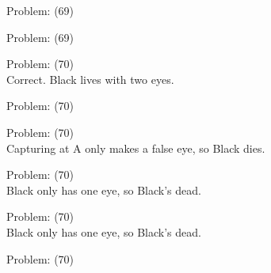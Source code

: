 \documentclass[11pt]{article}
\begin{document}
\begin{minipage}[t]{0.5\textwidth}
  {\centering
  
Problem: (69)\\
  }
\end{minipage}
\begin{minipage}[t]{0.5\textwidth}
  {\centering
  
Problem: (69)\\
  }
\end{minipage}
\begin{minipage}[t]{0.5\textwidth}
  {\centering
  
Problem: (70)\\
Correct. Black lives with two eyes.\\
  }
\end{minipage}
\begin{minipage}[t]{0.5\textwidth}
  {\centering
  
Problem: (70)\\
  }
\end{minipage}
\begin{minipage}[t]{0.5\textwidth}
  {\centering
  
Problem: (70)\\
Capturing at A only makes a false eye, so Black dies.\\
  }
\end{minipage}
\begin{minipage}[t]{0.5\textwidth}
  {\centering
  
Problem: (70)\\
Black only has one eye, so Black's dead.\\
  }
\end{minipage}
\begin{minipage}[t]{0.5\textwidth}
  {\centering
  
Problem: (70)\\
Black only has one eye, so Black's dead.\\
  }
\end{minipage}
\begin{minipage}[t]{0.5\textwidth}
  {\centering
  
Problem: (70)\\
  }
\end{minipage}
\end{document}
